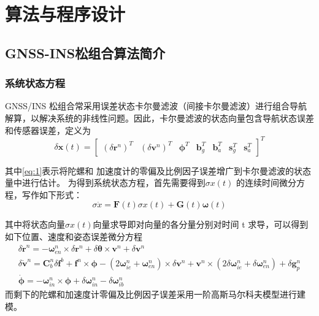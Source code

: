 \documentclass[codepkg=listings,theme=fancy]{course-report}
\begin{document}
\chapter{算法与程序设计}
\section{GNSS-INS松组合算法简介}
\subsection{系统状态方程}
GNSS/INS 松组合常采用误差状态卡尔曼滤波（间接卡尔曼滤波）进行组合导航解算，以解决系统的非线性问题。因此，卡尔曼滤波的状态向量包含导航状态误差和传感器误差，定义为
\begin{equation}
\delta \boldsymbol{x}(t)=\left[\begin{array}{lllllll}
\left(\delta \boldsymbol{r}^{n}\right)^{T} & \left(\delta \boldsymbol{v}^{n}\right)^{T} & \boldsymbol{\phi}^{T} & \boldsymbol{b}_{g}^{T} & \boldsymbol{b}_{a}^{T} & \boldsymbol{s}_{g}^{T} & \boldsymbol{s}_{a}^{T}
\end{array}\right]^{T}
\label{eq:1}
\end{equation}

其中\eqref{eq:1}表示将陀螺和
加速度计的零偏及比例因子误差增广到卡尔曼滤波的状态量中进行估计。
为得到系统状态方程，首先需要得到$\sigma x(t)$ 的连续时间微分方程，写作如下形式：
\begin{equation}
\sigma \dot{x}=\bm{F}(t)\sigma x(t)+\bm{G}(t)\bm{\omega}(t)
\label{eq:2}
\end{equation}

其中将状态向量$\sigma x(t)$向量求导即对向量的各分量分别对时间 t 求导，可以得到如下位置、速度和姿态误差微分方程
\begin{gather}
\delta \dot{\boldsymbol{r}}^{n}=-\boldsymbol{\omega}_{e n}^{n} \times \delta \boldsymbol{r}^{n}+\delta \boldsymbol{\theta} \times \boldsymbol{v}^{n}+\delta \boldsymbol{v}^{n} \\
\delta \dot{\boldsymbol{v}}^{n}=\mathbf{C}_{b}^{n} \delta \boldsymbol{f}^{b}+\boldsymbol{f}^{n} \times \boldsymbol{\phi}-\left(2 \boldsymbol{\omega}_{i e}^{n}+\boldsymbol{\omega}_{e n}^{n}\right) \times \delta \boldsymbol{v}^{n}+\boldsymbol{v}^{n} \times\left(2 \delta \boldsymbol{\omega}_{i e}^{n}+\delta \boldsymbol{\omega}_{e n}^{n}\right)+\delta \boldsymbol{g}_{p}^{n} \\
\dot{\boldsymbol{\phi}}=-\boldsymbol{\omega}_{i n}^{n} \times \boldsymbol{\phi}+\delta \boldsymbol{\omega}_{i n}^{n}-\delta \boldsymbol{\omega}_{i b}^{n}
\end{gather}
而剩下的陀螺和加速度计零偏及比例因子误差采用一阶高斯马尔科夫模型进行建模。
\end{document}
